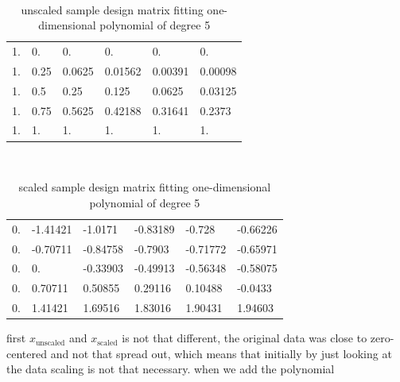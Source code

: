 \documentclass[twoside,11pt]{report}
\begin{document}
\begin{table}[!h]
\caption{unscaled sample design matrix fitting one-dimensional polynomial of degree 5}
\tt
\centering
\begin{tabular}{llllll}
    1. &     0.  &    0.  &    0.   &   0.   &   0.     \\
    1. &     0.25 &   0.0625 & 0.01562& 0.00391& 0.00098\\
    1.    &  0.5     &0.25 &   0.125 &  0.0625 & 0.03125\\
    1.   &   0.75  &  0.5625 & 0.42188 &0.31641& 0.2373 \\
    1.  &    1.   &   1.  &    1.  &    1.    &  1.
\end{tabular}%
\end{table}
\begin{table}[!h]
\caption{scaled sample design matrix fitting one-dimensional polynomial of degree 5}
\tt
\centering
\begin{tabular}{llllll}
     0. &     -1.41421& -1.0171&  -0.83189& -0.728 &  -0.66226\\
     0.  &    -0.70711& -0.84758& -0.7903 & -0.71772& -0.65971\\
     0.  &     0.    &  -0.33903& -0.49913& -0.56348& -0.58075\\
     0.  &     0.70711&  0.50855&  0.29116 & 0.10488& -0.0433 \\
     0.  &     1.41421&  1.69516 & 1.83016 & 1.90431&  1.94603
\end{tabular}%
\end{table}
\begin{table}[h]
\centering
{}
\end{table}
first $x_{\text{unscaled}}$ and $x_{\text{scaled}}$ is not that different, the original 
data was close to zero-centered and not that spread out, which means that initially by 
just looking at the data scaling is not that necessary. when we add the polynomial
\end{document}

